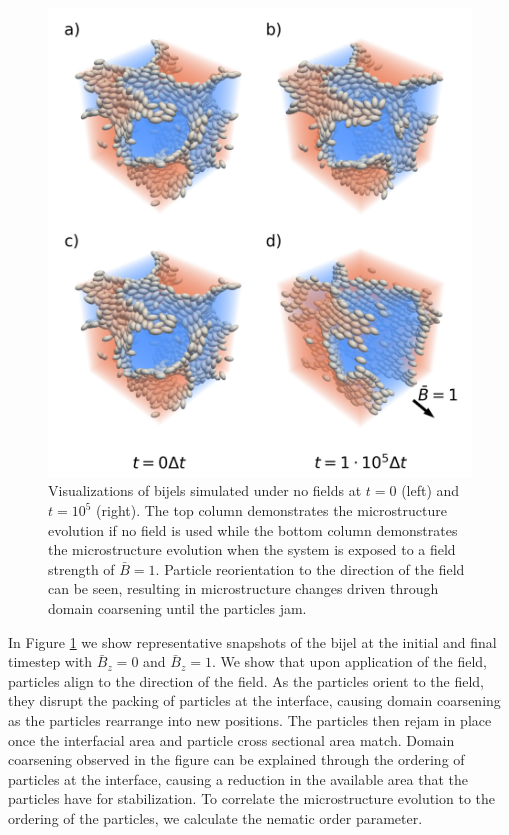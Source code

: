 \begin{figure} 
    \centering 
    \includegraphics[width=\columnwidth]{../figures/results/paper2/microstructure_viz-field_on.png} 
    \caption{Visualizations of bijels simulated under no fields at $t = 0$ (left) and $t = 10^5$ (right). The top 
            column demonstrates the microstructure evolution if no field is used while the bottom column demonstrates 
            the microstructure evolution when the system is exposed to a field strength of $\bar{B} = 1$. Particle 
            reorientation to the direction of the field can be seen, resulting in microstructure changes driven 
            through domain coarsening until the particles jam.} 
    \label{fig:microstructure_viz-field_on} 
\end{figure}

In Figure \ref{fig:microstructure_viz-field_on} we show representative snapshots of the bijel at the initial and 
final timestep with $\bar{B}_z = 0$ and $\bar{B}_z = 1$. We show that upon application of the field, particles align 
to the direction of the field. As the particles orient to the field, they disrupt the packing of particles at the 
interface, causing domain coarsening as the particles rearrange into new positions. The particles then rejam in 
place once the interfacial area and particle cross sectional area match. Domain coarsening observed in the figure 
can be explained through the ordering of particles at the interface, causing a reduction in the available area that 
the particles have for stabilization. To correlate the microstructure evolution to the ordering of the particles, we calculate the 
nematic order parameter. \cite{cuesta_monte_1990} 

